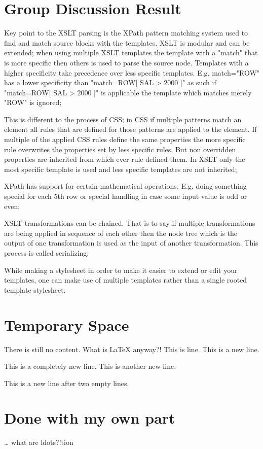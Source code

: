 \documentclass[titlepage; draft]{report}
\begin{document}
\section{Group Discussion Result}
	Key point to the XSLT parsing is the XPath pattern matching system used to find and match source blocks with the templates. XSLT is modular and can be extended; when using multiple XSLT templates the template with a "match" that is more specific then others is used to parse the source node. Templates with a higher specificity take precedence over less specific templates. E.g. match="ROW" has a lower specificity than "match=ROW[ SAL > 2000 ]" as such if "match=ROW[ SAL > 2000 ]" is applicable the template which matches merely "ROW" is ignored;

	This is different to the process of CSS; in CSS if multiple patterns match an element all rules that are defined for those patterns are applied to the element. If multiple of the applied CSS rules define the same properties the more specific rule overwrites the properties set by less specific rules. But non overridden properties are inherited from which ever rule defined them. In XSLT only the most specific template is used and less specific templates are not inherited;
	
	XPath has support for certain mathematical operations. E.g. doing something special for each 5th row or special handling in case some input value is odd or even;
	
	XSLT transformations can be chained. That is to say if multiple transformations are being applied in sequence of each other then the node tree which is the output of one transformation is used as the input of another transformation. This process is called serializing;
	
	While making a stylesheet in order to make it easier to extend or edit your templates, one can make use of multiple templates rather than a single rooted template stylesheet.
\section{Temporary Space}
        There is still no content.
        What is \LaTeX{} anyway?!
        This is line.
        This is a new line.

        This is a completely new line.\newline
        This is another new line.


        This is a new line after two empty lines.
\section{Done with my own part}
\ldots{} what are ldots?!tion
\end{document}
